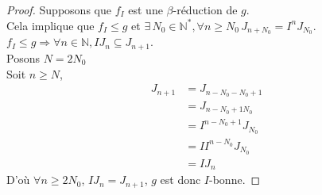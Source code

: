 \begin{proof}
	Supposons que $f_I$ est une $\beta$-réduction de $g$.\\
	Cela implique que $f_I \leq g$ et $\exists \, N_0 \in \mathbb{N^*} , \forall n \geq N_0 \, J_{n+N_0} = I^n J_{N_0}$.\\
	$f_I \leq g \Rightarrow \forall n \in \mathbb{N} , IJ_n \subseteq J_{n+1}$.\\
	Posons $N = 2N_0$\\
	Soit $n \geq N$, 
	\begin{align*}
		J_{n+1} &= J_{n-N_0-N_0+1}\\
		&= J_{n-N_0+1N_0}\\
		&= I^{n-N_0+1} J_{N_0}\\
		&= II^{n-N_0} J_{N_0}\\
		&= IJ_n
	\end{align*}
	D'où $\forall n \geq 2N_0$, $IJ_n = J_{n+1}$, $g$ est donc $I$-bonne. 
\end{proof}


